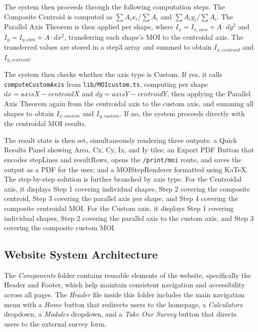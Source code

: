 The system then proceeds through the following computation steps. The 
Composite Centroid is computed as $\sum A_{i} x_{i} / \sum A_{i}$ 
and $\sum A_{i} y_{i} / \sum A_{i}$. The Parallel Axis Theorem is 
then applied per shape, where $I_{x} = I_{x,own} + A \cdot dy^{2}$ 
and $I_{y} = I_{y,own} + A \cdot dx^{2}$, transferring each shape's 
MOI to the centroidal axis. The transferred values are stored in a 
step3 array and summed to obtain $I_{x,centroid}$ and 
$I_{y,centroid}$.

The system then checks whether the axis type is Custom. If yes, it 
calls \texttt{computeCustomAxis} from \texttt{lib/MOIcustom.ts}, 
computing per shape $dx = axisX - centroidX$ and 
$dy = axisY - centroidY$, then applying the Parallel Axis Theorem 
again from the centroidal axis to the custom axis, and summing all 
shapes to obtain $I_{x,custom}$ and $I_{y,custom}$. If no, the 
system proceeds directly with the centroidal MOI results.

The result state is then set, simultaneously rendering three outputs: 
a Quick Results Panel showing Area, Cx, Cy, Ix, and Iy tiles; an 
Export PDF Button that encodes stepLines and resultRows, opens the 
\texttt{/print/moi} route, and saves the output as a PDF for the 
user; and a MOIStepRenderer formatted using KaTeX. The step-by-step 
solution is further branched by axis type. For the Centroidal axis, 
it displays Step 1 covering individual shapes, Step 2 covering the 
composite centroid, Step 3 covering the parallel axis per shape, and 
Step 4 covering the composite centroidal MOI. For the Custom axis, it 
displays Step 1 covering individual shapes, Step 2 covering the 
parallel axis to the custom axis, and Step 3 covering the composite 
custom MOI.


\subsection{Website System Architecture}

The \textit{Components} folder contains reusable elements of the 
website, specifically the Header and Footer, which help maintain 
consistent navigation and accessibility across all pages. The 
\textit{Header} file inside this folder includes the main navigation 
menu with a \textit{Home} button that redirects users to the 
homepage, a \textit{Calculators} dropdown, a \textit{Modules} 
dropdown, and a \textit{Take Our Survey} button that directs users to 
the external survey form.

